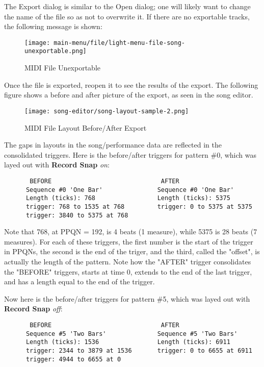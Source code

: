    The Export dialog is similar to the Open dialog; one will likely want to
   change the name of the file so as not to overwrite it.
   If there are no exportable tracks, the following message is shown:

\begin{figure}[H]
   \centering 
   \texttt{[image: main-menu/file/light-menu-file-song-unexportable.png]}
   \caption{MIDI File Unexportable}
   \label{fig:midi_export_file_unexportable}
\end{figure}

   Once the file is exported, reopen it to see the results of the export.
   The following figure shows a before and after picture of the export, as
   seen in the song editor.

\begin{figure}[H]
   \centering 
   \texttt{[image: song-editor/song-layout-sample-2.png]}
   \caption{MIDI File Layout Before/After Export}
   \label{fig:midi_export_file_before_after}
\end{figure}
   
   The gaps in layouts in the song/performance data are reflected in the
   consolidated triggers.
   Here is the before/after triggers for pattern \#0, which was
   layed out with \textbf{Record Snap} \textsl{on}:

   \begin{verbatim}
       BEFORE                              AFTER
      Sequence #0 'One Bar'               Sequence #0 'One Bar'
      Length (ticks): 768                 Length (ticks): 5375
      trigger: 768 to 1535 at 768         trigger: 0 to 5375 at 5375
      trigger: 3840 to 5375 at 768        
   \end{verbatim}

   Note that 768, at PPQN = 192, is 4 beats (1 measure), while 5375 is 28
   beats (7 measures).
   For each of these triggers, the first number is the start of the trigger in
   PPQNs, the second is the end of the triger, and the third, called the
   "offset", is actually the length of the pattern.
   Note how the "AFTER"
   trigger consolidates the "BEFORE" triggers, starts at time 0, extends to
   the end of the last trigger, and has a length equal to the end of the
   trigger.

   Now here is the before/after triggers for pattern \#5, which was
   layed out with \textbf{Record Snap} \textsl{off}:

   \begin{verbatim}
       BEFORE                              AFTER
      Sequence #5 'Two Bars'              Sequence #5 'Two Bars'
      Length (ticks): 1536                Length (ticks): 6911
      trigger: 2344 to 3879 at 1536       trigger: 0 to 6655 at 6911
      trigger: 4944 to 6655 at 0
   \end{verbatim}

